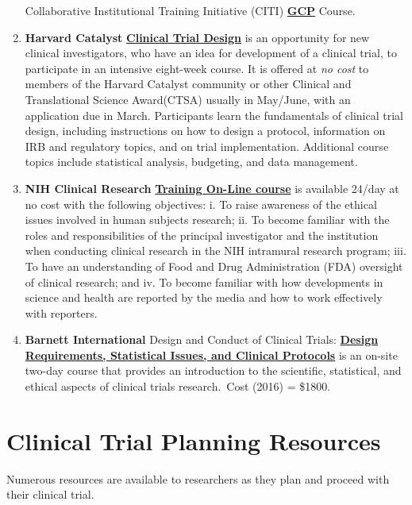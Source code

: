 \documentclass[]{book}
\theoremstyle{definition}
\theoremstyle{definition}
\theoremstyle{definition}
\theoremstyle{remark}
\begin{document}
\begin{enumerate}
  Collaborative Institutional Training Initiative (CITI)
  \href{https://www.citiprogram.org/index.cfm?pageID=90}{\textbf{GCP}}
  Course.
\item
  \textbf{Harvard Catalyst}
  \href{https://catalyst.harvard.edu/services/ctd/}{\textbf{Clinical
  Trial Design}} is an opportunity for new clinical investigators, who
  have an idea for development of a clinical trial, to participate in an
  intensive eight-week course. It is offered at \emph{no cost} to
  members of the Harvard Catalyst community or other Clinical and
  Translational Science Award(CTSA) usually in May/June, with an
  application due in March. Participants learn the fundamentals of
  clinical trial design, including instructions on how to design a
  protocol, information on IRB and regulatory topics, and on trial
  implementation. Additional course topics include statistical analysis,
  budgeting, and data management.
\item
  \textbf{NIH Clinical Research}
  \href{http://crt.nihtraining.com}{\textbf{Training On-Line course}} is
  available 24/day at no cost with the following objectives: i. To raise
  awareness of the ethical issues involved in human subjects research;
  ii. To become familiar with the roles and responsibilities of the
  principal investigator and the institution when conducting clinical
  research in the NIH intramural research program; iii. To have an
  understanding of Food and Drug Administration (FDA) oversight of
  clinical research; and iv. To become familiar with how developments in
  science and health are reported by the media and how to work
  effectively with reporters.
\item
  \textbf{Barnett International} Design and Conduct of Clinical Trials:
  \href{http://www.barnettinternational.com/Live-Seminars/Design-and-Conduct-of-Clinical-Trials--Design-Requirements,-Statistical-Issues,-and-Clinical-Protocols/}{\textbf{Design
  Requirements, Statistical Issues, and Clinical Protocols}} is an
  on-site two-day course that provides an introduction to the
  scientific, statistical, and ethical aspects of clinical trials
  research.~Cost (2016) = \$1800.
\end{enumerate}

\section{Clinical Trial Planning
Resources}\label{clinical-trial-planning-resources}

Numerous resources are available to researchers as they plan and proceed
with their clinical trial.
\end{document}
